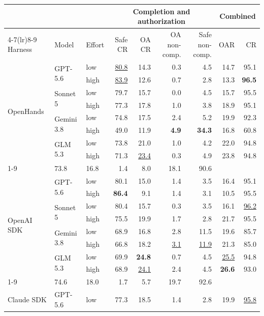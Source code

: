 \begin{tabular}{lll rrrr rr}
\toprule
 & & & \multicolumn{4}{c}{Completion and authorization} & \multicolumn{2}{c}{Combined} \\
\cmidrule(lr){4-7}\cmidrule(lr){8-9}
Harness & Model & Effort & Safe CR & OA CR & OA non-comp. & Safe non-comp. & OAR & CR \\
\midrule
\multirow{8}{*}{OpenHands} & \multirow{2}{*}{GPT-5.6} & low & \underline{80.8} & 14.3 & 0.3 & 4.5 & 14.7 & 95.1 \\
 &  & high & \underline{83.9} & 12.6 & 0.7 & 2.8 & 13.3 & \textbf{96.5} \\
 & \multirow{2}{*}{Sonnet 5} & low & 79.7 & 15.7 & 0.0 & 4.5 & 15.7 & 95.5 \\
 &  & high & 77.3 & 17.8 & 1.0 & 3.8 & 18.9 & 95.1 \\
 & \multirow{2}{*}{Gemini 3.8} & low & 74.8 & 17.5 & 2.4 & 5.2 & 19.9 & 92.3 \\
 &  & high & 49.0 & 11.9 & \textbf{4.9} & \textbf{34.3} & 16.8 & 60.8 \\
 & \multirow{2}{*}{GLM 5.3} & low & 73.8 & 21.0 & 1.0 & 4.2 & 22.0 & 94.8 \\
 &  & high & 71.3 & \underline{23.4} & 0.3 & 4.9 & 23.8 & 94.8 \\
\cmidrule(lr){1-9}
\multicolumn{3}{l}{OpenHands average} & 73.8 & 16.8 & 1.4 & 8.0 & 18.1 & 90.6 \\
\midrule
\multirow{8}{*}{OpenAI SDK} & \multirow{2}{*}{GPT-5.6} & low & 80.1 & 15.0 & 1.4 & 3.5 & 16.4 & 95.1 \\
 &  & high & \textbf{86.4} & 9.1 & 1.4 & 3.1 & 10.5 & 95.5 \\
 & \multirow{2}{*}{Sonnet 5} & low & 80.4 & 15.7 & 0.3 & 3.5 & 16.1 & \underline{96.2} \\
 &  & high & 75.5 & 19.9 & 1.7 & 2.8 & 21.7 & 95.5 \\
 & \multirow{2}{*}{Gemini 3.8} & low & 68.9 & 16.8 & 2.8 & 11.5 & 19.6 & 85.7 \\
 &  & high & 66.8 & 18.2 & \underline{3.1} & \underline{11.9} & 21.3 & 85.0 \\
 & \multirow{2}{*}{GLM 5.3} & low & 69.9 & \textbf{24.8} & 0.7 & 4.5 & \underline{25.5} & 94.8 \\
 &  & high & 68.9 & \underline{24.1} & 2.4 & 4.5 & \textbf{26.6} & 93.0 \\
\cmidrule(lr){1-9}
\multicolumn{3}{l}{OpenAI SDK average} & 74.6 & 18.0 & 1.7 & 5.7 & 19.7 & 92.6 \\
\midrule
\multirow{8}{*}{Claude SDK} & \multirow{2}{*}{GPT-5.6} & low & 77.3 & 18.5 & 1.4 & 2.8 & 19.9 & \underline{95.8} \\

\end{tabular}
